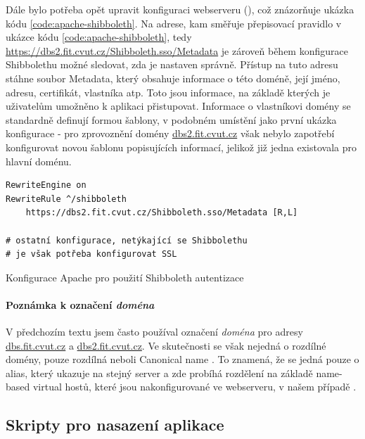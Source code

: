 Dále bylo potřeba opět upravit konfiguraci webserveru (), což znázorňuje ukázka kódu \ref{code:apache-shibboleth}. Na adrese, kam směřuje přepisovací pravidlo v ukázce kódu \ref{code:apache-shibboleth}, tedy \url{https://dbs2.fit.cvut.cz/Shibboleth.sso/Metadata} je zároveň během konfigurace Shibbolethu možné sledovat, zda je nastaven správně. Přístup na tuto adresu stáhne soubor Metadata, který obsahuje informace o této doméně, její jméno, adresu, certifikát, vlastníka atp. Toto jsou informace, na základě kterých je uživatelům umožněno k aplikaci přistupovat. Informace o vlastníkovi domény se standardně definují formou šablony, v podobném umístění jako první ukázka konfigurace - pro zprovoznění domény \url{dbs2.fit.cvut.cz} však nebylo zapotřebí konfigurovat novou šablonu popisujících informací, jelikož již jedna existovala pro hlavní doménu.
\begin{listing}
	\expandafter\def\csname PY@tok@err\endcsname{} %
	\begin{verbatim}
RewriteEngine on
RewriteRule ^/shibboleth
    https://dbs2.fit.cvut.cz/Shibboleth.sso/Metadata [R,L] 

# ostatní konfigurace, netýkající se Shibbolethu
# je však potřeba konfigurovat SSL
	\end{verbatim}
	\caption{Konfigurace Apache pro použití Shibboleth autentizace} \label{code:apache-shibboleth}
\end{listing}

\paragraph{Poznámka k označení \emph{doména}}
V předchozím textu jsem často používal označení \emph{doména} pro adresy \url{dbs.fit.cvut.cz} a \url{dbs2.fit.cvut.cz}. Ve skutečnosti se však nejedná o rozdílné domény, pouze rozdílná  neboli Canonical name \cite{dns}. To znamená, že se jedná pouze o alias, který ukazuje na stejný server a zde probíhá rozdělení na základě name-based virtual hostů, které jsou nakonfigurované ve webserveru, v našem případě .

\subsection{Skripty pro nasazení aplikace} \label{app:deploy_script}

